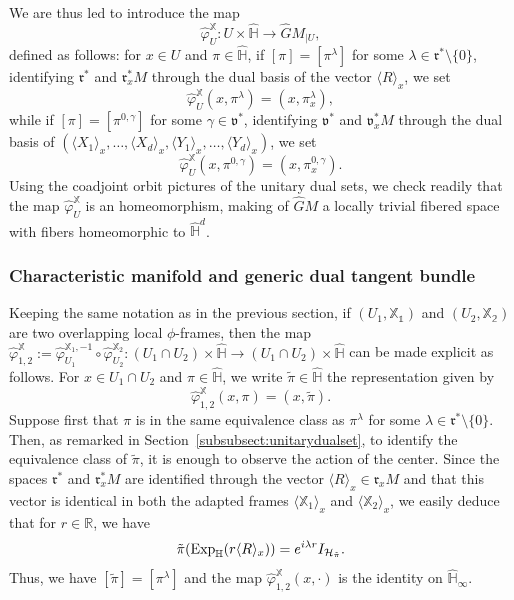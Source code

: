 \documentclass[12pt,a4paper]{amsart}
\theoremstyle{plain}
\theoremstyle{definition}
\theoremstyle{remark}
\numberwithin{equation}{section}
\theoremstyle{definition}
\def\R{{\mathbb R}}%
\def \Exp{{\rm Exp}}
\def \bX{\mathbb{X}}
\def \Heis{\mathbb{H}}
\def \Ghat{\widehat{G}}
\def \Hhat{\widehat{\Heis}}
\def \cH{\mathcal{H}}
\def \fv{\mathfrak{v}}
\def \fr{\mathfrak{r}}
\numberwithin{equation}{section}
\begin{document}
We are thus led to introduce the map
\begin{equation*}
 \hat{\varphi}_{U}^\bX: U\times \Hhat \rightarrow \Ghat M_{|U},
\end{equation*}
defined as follows: for $x\in U$ and $\pi\in \Hhat$, if $[\pi] = [\pi^\lambda]$ for some $\lambda\in \fr^{*}\setminus\{0\}$, identifying $\fr^*$ and $\fr_{x}^* M$ through the dual basis of the vector $\langle R\rangle_x$, we set
\begin{equation*}
 \hat{\varphi}_{U}^\bX(x,\pi^\lambda) = (x,\pi_{x}^\lambda),
\end{equation*}
while if $[\pi] = [\pi^{0,\gamma}]$ for some $\gamma\in \fv^{*}$, identifying $\fv^*$ and $\fv_{x}^* M$ through the dual basis of $(\langle X_1\rangle_x,\dots,\langle X_d\rangle_x,\langle Y_1\rangle_x,\dots,\langle Y_d\rangle_x)$, we set
\begin{equation*}
 \hat{\varphi}_{U}^\bX(x,\pi^{0,\gamma}) = (x,\pi_{x}^{0,\gamma}).
\end{equation*}
Using the coadjoint orbit pictures of the unitary dual sets, we check readily that the map $\hat{\varphi}_{U}^\bX$ is an homeomorphism, making of $\Ghat M$ a locally trivial fibered space with fibers homeomorphic to $\Hhat^d$.

\subsubsection{Characteristic manifold and generic dual tangent bundle}
\label{subsubsect:charmanifold}

Keeping the same notation as in the previous section, if $(U_1,\mathbb{X_1})$ and $(U_2,\mathbb{X_2})$ are two overlapping local $\phi$-frames, then the map $\hat{\varphi}_{1,2}^\bX := \hat{\varphi}_{U_1}^{\bX_1,-1}\circ \hat{\varphi}_{U_2}^{\bX_2}: (U_1\cap U_2)\times \Hhat \rightarrow (U_1\cap U_2)\times \Hhat$ can be made explicit as follows.
For $x \in U_1\cap U_2$ and $\pi\in\Hhat$, we write $\tilde{\pi}\in\Hhat$ the representation given by 
\begin{equation*}
 \hat{\varphi}_{1,2}^\bX(x,\pi) = (x,\tilde{\pi}).
\end{equation*}
Suppose first that $\pi$ is in the same equivalence class as $\pi^\lambda$ for some $\lambda\in \fr^{*}\setminus\{0\}$. Then, as remarked in Section~\ref{subsubsect:unitarydualset}, to identify the equivalence class
of $\tilde{\pi}$, it is enough to observe the action of the center. Since the spaces $\fr^*$ and $\fr_{x}^* M$ are identified through the vector $\langle R\rangle_x \in\fr_x M$ and that this vector is identical in both 
the adapted frames $\langle \bX_1\rangle_x$ and $\langle \bX_2\rangle_x$, we easily deduce that for $r\in\R$, we have 
\begin{equation*}
 \tilde{\pi}(\Exp_\Heis(r \langle R\rangle_x)) = e^{i\lambda r}I_{\cH_{\tilde{\pi}}}.
\end{equation*}
Thus, we have $[\tilde{\pi}] = [\pi^\lambda]$ and the map $\hat{\varphi}_{1,2}^\bX(x,\cdot)$ is the identity on $\Hhat_\infty$.
\end{document}
